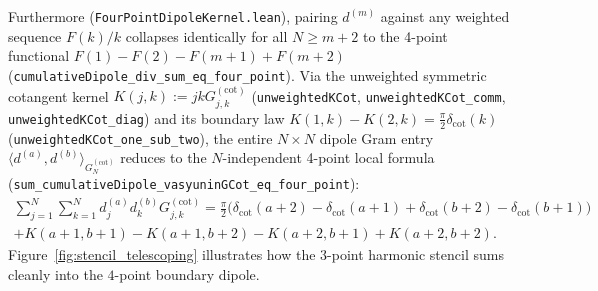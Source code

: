 \documentclass[11pt,a4paper]{article}
\theoremstyle{definition}
\begin{document}
Furthermore (\texttt{Four\allowbreak Point\allowbreak Dipole\allowbreak Kernel.lean}), pairing $d^{(m)}$ against any weighted sequence $F(k)/k$ collapses identically for all $N \ge m + 2$ to the 4-point functional $F(1) - F(2) - F(m+1) + F(m+2)$ (\texttt{cumulative\allowbreak Dipole\_\allowbreak div\_\allowbreak sum\_\allowbreak eq\_\allowbreak four\_\allowbreak point}). Via the unweighted symmetric cotangent kernel $K(j, k) := j k G_{j,k}^{(\mathrm{cot})}$ (\texttt{unweighted\allowbreak KCot}, \texttt{unweighted\allowbreak KCot\_\allowbreak comm}, \texttt{unweighted\allowbreak KCot\_\allowbreak diag}) and its boundary law $K(1, k) - K(2, k) = \frac{\pi}{2}\delta_{\mathrm{cot}}(k)$ (\texttt{unweighted\allowbreak KCot\_\allowbreak one\_\allowbreak sub\_\allowbreak two}), the entire $N \times N$ dipole Gram entry $\langle d^{(a)}, d^{(b)}\rangle_{G_N^{(\mathrm{cot})}}$ reduces to the $N$-independent 4-point local formula (\texttt{sum\_\allowbreak cumulative\allowbreak Dipole\_\allowbreak vasyunin\allowbreak GCot\_\allowbreak eq\_\allowbreak four\_\allowbreak point}):
\begin{multline}
\sum_{j=1}^N \sum_{k=1}^N d_j^{(a)} d_k^{(b)} G_{j,k}^{(\mathrm{cot})} = \frac{\pi}{2}\big(\delta_{\mathrm{cot}}(a+2) - \delta_{\mathrm{cot}}(a+1) + \delta_{\mathrm{cot}}(b+2) - \delta_{\mathrm{cot}}(b+1)\big) \\
+ K(a+1, b+1) - K(a+1, b+2) - K(a+2, b+1) + K(a+2, b+2).
\end{multline}
Figure~\ref{fig:stencil_telescoping} illustrates how the $3$-point harmonic stencil sums cleanly into the $4$-point boundary dipole.
\end{document}
